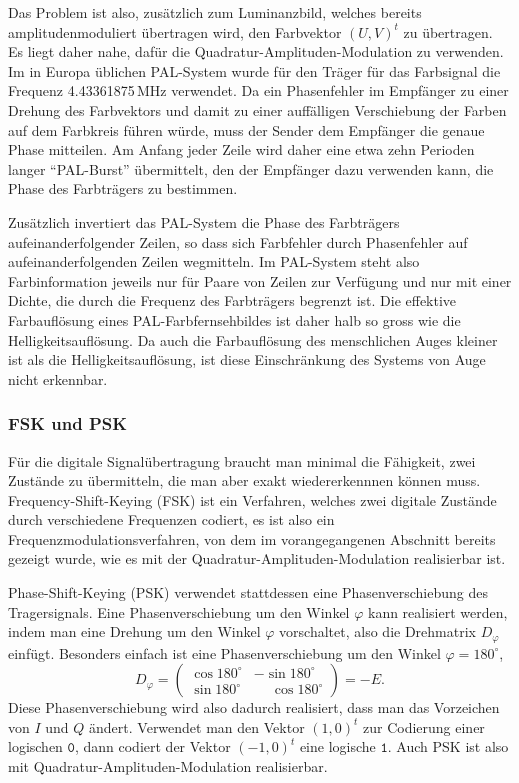 Das Problem ist also, zusätzlich zum Luminanzbild, welches bereits
amplitudenmoduliert übertragen wird, den Farbvektor $(U,V)^t$ zu
übertragen.
Es liegt daher nahe, dafür die Quadratur-Amplituden-Modulation zu
verwenden.
Im in Europa üblichen PAL-System wurde für den Träger für das Farbsignal
die Frequenz 4.43361875\,MHz verwendet.
Da ein Phasenfehler im Empfänger zu einer Drehung des Farbvektors
und damit zu einer auffälligen Verschiebung der Farben auf dem Farbkreis
führen würde, muss der Sender dem Empfänger die genaue Phase mitteilen.
Am Anfang jeder Zeile wird daher eine etwa zehn Perioden langer ``PAL-Burst''
übermittelt, den der Empfänger dazu verwenden kann, die Phase des
Farbträgers zu bestimmen.

Zusätzlich invertiert das PAL-System die Phase des Farbträgers
aufeinanderfolgender Zeilen, so dass sich Farbfehler durch Phasenfehler
auf aufeinanderfolgenden Zeilen wegmitteln.
Im PAL-System steht also Farbinformation jeweils nur für Paare von Zeilen
zur Verfügung und nur mit einer Dichte, die durch die Frequenz des Farbträgers
begrenzt ist.
Die effektive Farbauflösung eines PAL-Farbfernsehbildes ist daher halb so
gross wie die Helligkeitsauflösung.
Da auch die Farbauflösung des menschlichen Auges kleiner ist als die
Helligkeitsauflösung, ist diese Einschränkung des Systems von Auge nicht 
erkennbar.

\subsubsection{FSK und PSK}
Für die digitale Signalübertragung braucht man minimal die Fähigkeit,
zwei Zustände zu übermitteln, die man aber exakt wiedererkennnen können muss.
Frequency-Shift-Keying (FSK) ist ein Verfahren, welches zwei digitale Zustände
durch verschiedene Frequenzen codiert, es ist also ein
Frequenzmodulationsverfahren, von dem im vorangegangenen Abschnitt
bereits gezeigt wurde, wie es mit der Quadratur-Amplituden-Modulation
realisierbar ist.

Phase-Shift-Keying (PSK) verwendet stattdessen eine Phasenverschiebung
des Tragersignals.
Eine Phasenverschiebung um den Winkel $\varphi$ kann realisiert werden,
indem man eine Drehung um den Winkel $\varphi$ vorschaltet, also die
Drehmatrix $D_{\varphi}$ einfügt.
Besonders einfach ist eine Phasenverschiebung um den Winkel
$\varphi=180^\circ$, 
\[
D_{\varphi}
=
\begin{pmatrix}
\cos180^\circ&          - \sin180^\circ \\
\sin180^\circ& \phantom{-}\cos180^\circ
\end{pmatrix}
=
-E.
\]
Diese Phasenverschiebung wird also dadurch realisiert, dass man das
Vorzeichen von $I$ und $Q$ ändert.
Verwendet man den Vektor $(1,0)^t$ zur Codierung einer logischen
$\texttt{0}$, dann codiert der Vektor $(-1,0)^t$ eine logische $\texttt{1}$.
Auch PSK ist also mit Quadratur-Amplituden-Modulation realisierbar.

